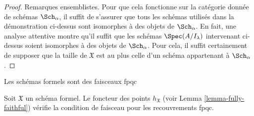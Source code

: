 \begin{proof}
\medskip\noindent
Remarques ensemblistes. Pour que cela fonctionne sur la catégorie donnée
de schémas $\Sch_\alpha$, il suffit de s'assurer que tous les
schémas utilisés dans la démonstration ci-dessus sont isomorphes à des objets de $\Sch_\alpha$.
En fait, une analyse attentive montre qu'il suffit que les
schémas $\Spec(A/I_\lambda)$ intervenant ci-dessus soient isomorphes à des
objets de $\Sch_\alpha$. Pour cela, il suffit certainement de supposer que
la taille de $\mathfrak X$ est au plus celle
d'un schéma appartenant à $\Sch_\alpha$.
\end{proof}

\begin{lemma}
\label{lemma-formal-scheme-sheaf-fppf}
\begin{slogan}
Les schémas formels sont des faisceaux fpqc
\end{slogan}
Soit $\mathfrak X$ un schéma formel. Le foncteur des points
$h_\mathfrak X$ (voir Lemma \ref{lemma-fully-faithful})
vérifie la condition de faisceau pour les recouvrements fpqc.
\end{lemma}

